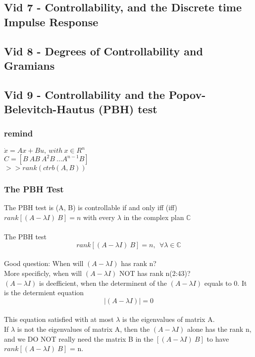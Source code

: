 \subsection{Vid 7 - Controllability, and the Discrete time Impulse Response }
\subsection{Vid 8 - Degrees of Controllability and Gramians }
\subsection{Vid 9 - Controllability and the Popov-Belevitch-Hautus (PBH) test}

	\subsubsection{remind}
		$\dot{x} = Ax + Bu, ~with~ x\in R^n$ \\
		$C = [B ~ AB ~ A^{2}B ~ \ldots A^{n-1}B]$\\
		$>> rank(ctrb(A,B))$\\

	\subsubsection{The PBH Test}
		The PBH test is (A, B) is controllable if and only iff (iff)
		$rank[(A - \lambda I) ~B] = n$ with every $\lambda$ in the complex plan $\mathbb{C} $ \\
		\\The PBH test
		\begin{equation}
			rank[(A - \lambda I) ~B] = n,~~\forall \lambda \in \mathbb{C}
		\end{equation}
		\\Good question: When will $(A - \lambda I)$ has rank n?
		\\More specificly, when will $(A - \lambda I)$ NOT has rank n(2:43)?
		\\$(A - \lambda I)$ is deefficient, when the determinent of the $(A - \lambda I)$ equals to 0.
		It is the determient equation \begin{equation}  |(A - \lambda I)| = 0 \end{equation}
		\\This equation satisfied with at most $\lambda$ is the eigenvalues of matrix A.
		\\If $\lambda$ is not the eigenvalues of matrix A, then the $(A - \lambda I)$ alone has the rank n,
		and we DO NOT really need the matrix B in the $[(A - \lambda I) ~B]$ to have $rank[(A - \lambda I) ~B]$ = n.\\

